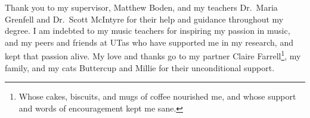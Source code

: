 \cleardoublepage{}
\renewcommand*{\thefootnote}{\fnsymbol{footnote}}
\begin{center}
	
	Thank you to my supervisor, Matthew Boden, and my teachers Dr.\ Maria Grenfell and Dr.\ Scott McIntyre for their help and guidance throughout my degree. 
	I am indebted to my music teachers for inspiring my passion in music, and my peers and friends at UTas who have supported me in my research, and kept that passion alive. 
	My love and thanks go to my partner Claire Farrell\footnote{Whose cakes, biscuits, and mugs of coffee nourished me, and whose support and words of encouragement kept me sane.}, my family, and my cats Buttercup and Millie for their unconditional support.
	
\end{center}
\cleardoublepage{}
